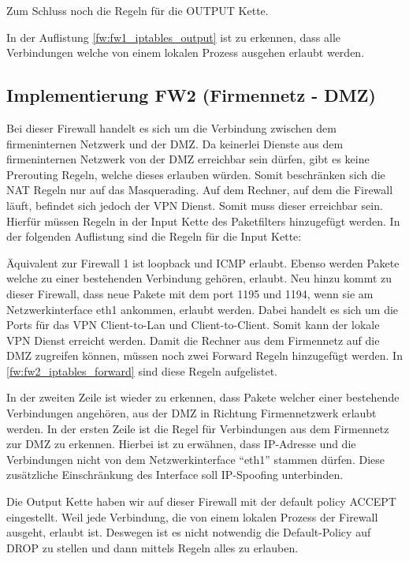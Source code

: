 Zum Schluss noch die Regeln für die OUTPUT Kette.

In der Auflistung \ref{fw:fw1_iptables_output} ist zu erkennen, dass alle Verbindungen welche von einem lokalen Prozess ausgehen erlaubt werden.

\subsection{Implementierung FW2 (Firmennetz - DMZ)}
Bei dieser Firewall handelt es sich um die Verbindung zwischen dem firmeninternen Netzwerk und der DMZ. Da keinerlei Dienste aus dem firmeninternen Netzwerk von der DMZ erreichbar sein dürfen, gibt es keine Prerouting Regeln, welche dieses erlauben würden. Somit beschränken sich die NAT Regeln nur auf das Masquerading. 
Auf dem Rechner, auf dem die Firewall läuft, befindet sich jedoch der VPN Dienst. Somit muss dieser erreichbar sein. Hierfür müssen Regeln in der Input Kette des Paketfilters hinzugefügt werden. In der folgenden Auflistung sind die Regeln für die Input Kette:

Äquivalent zur Firewall 1 ist loopback und ICMP erlaubt. Ebenso werden Pakete welche zu einer bestehenden Verbindung gehören, erlaubt. Neu hinzu kommt zu dieser Firewall, dass neue Pakete mit dem port 1195 und 1194, wenn sie am Netzwerkinterface eth1 ankommen, erlaubt werden. Dabei handelt es sich um die Ports für das VPN Client-to-Lan und Client-to-Client. Somit kann der lokale VPN Dienst erreicht werden.
Damit die Rechner aus dem Firmennetz auf die DMZ zugreifen können, müssen noch zwei Forward Regeln hinzugefügt werden. In \ref{fw:fw2_iptables_forward} sind diese Regeln aufgelistet.

In der zweiten Zeile ist wieder zu erkennen, dass Pakete welcher einer bestehende Verbindungen angehören, aus der DMZ in Richtung Firmennetzwerk erlaubt werden. In der ersten Zeile ist die Regel für Verbindungen aus dem Firmennetz zur DMZ zu erkennen. Hierbei ist zu erwähnen, dass IP-Adresse und die Verbindungen nicht von dem Netzwerkinterface "`eth1"' stammen dürfen. Diese zusätzliche Einschränkung des Interface soll IP-Spoofing unterbinden.

Die Output Kette haben wir auf dieser Firewall mit der default policy ACCEPT eingestellt. Weil jede Verbindung, die von einem lokalen Prozess der Firewall ausgeht, erlaubt ist. Deswegen ist es nicht notwendig die Default-Policy auf DROP zu stellen und dann mittels Regeln alles zu erlauben.
